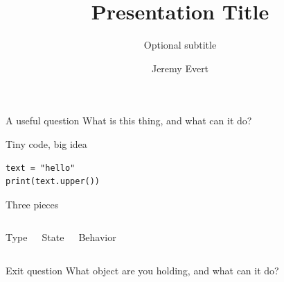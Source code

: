 \documentclass[aspectratio=169,11pt]{beamer}
\title{Presentation Title}
\subtitle{Optional subtitle}
\author{Jeremy Evert}
\institute{SWOSU}
\date{}
\begin{document}
\begin{frame}
  \titlepage
\end{frame}

\begin{frame}{A useful question}
  \centering
  \Huge What is this thing, and what can it do?
\end{frame}

\begin{frame}[fragile]{Tiny code, big idea}
\begin{lstlisting}
text = "hello"
print(text.upper())
\end{lstlisting}
\end{frame}

\begin{frame}{Three pieces}
  \begin{columns}[T,onlytextwidth]
      \centering
      \Large Type

      \centering
      \Large State

      \centering
      \Large Behavior
  \end{columns}
\end{frame}

\begin{frame}{Exit question}
  \centering
  \LARGE What object are you holding, and what can it do?
\end{frame}
\end{document}
